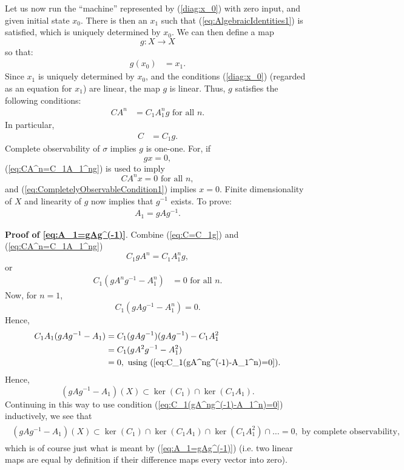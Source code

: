 \documentclass[12pt]{book}
\theoremstyle{plain}
\theoremstyle{definition}
\begin{document}
Let us now run the ``machine'' represented by (\ref{diag:x_0}) with zero input, and given initial state $x_0$.
There is then an $x_1$ such that (\ref{eq:AlgebraicIdentities1}) is satisfied, which is uniquely determined by $x_0$. We can then define a map
$$g: X \to X$$
so that:
\begin{align} \label{eq:g(x_0)=x_1}
    g(x_0) &= x_1.
\end{align}
Since $x_1$ is uniquely determined by $x_0$, and the conditions (\ref{diag:x_0}) (regarded as an equation for $x_1$) are linear, the map $g$ is linear. %
Thus, $g$ satisfies the following conditions:
\begin{align} \label{eq:CA^n=C_1A_1^ng}
    CA^n &= C_1A_1^ng \text{ for all } n.
\end{align}
In particular,
\begin{align} \label{eq:C=C_1g}
    C &= C_1g.
\end{align}
Complete observability of $\sigma$ implies $g$ is one-one.
For, if
$$gx = 0,$$
(\ref{eq:CA^n=C_1A_1^ng}) is used to imply
$$CA^nx = 0 \text{ for all } n,$$
and (\ref{eq:CompletelyObservableCondition1}) implies $x = 0$.
Finite dimensionality of $X$ and linearity of $g$ now implies that $g^{-1}$ exists.
To prove:
\begin{align} \label{eq:A_1=gAg^(-1)}
    A_1 = gAg^{-1}.
\end{align}

\textbf{Proof of \ref{eq:A_1=gAg^(-1)}}.
Combine (\ref{eq:C=C_1g}) and (\ref{eq:CA^n=C_1A_1^ng})
$$C_1gA^n = C_1A_1^ng,$$
or
\begin{align} \label{eq:C_1(gA^ng^(-1)-A_1^n)=0}
    C_1(gA^ng^{-1}-A_1^n) &= 0 \text{ for all } n.
\end{align}
Now, for $n = 1$,
$$C_1(gAg^{-1} - A_1^n) = 0.$$
Hence,
\begin{align*}
    C_1A_1(gAg^{-1}-A_1) &= C_1(gAg^{-1})(gAg^{-1}) - C_1A_1^2 \\
    &= C_1(gA^2g^{-1} - A_1^2) \\
    &= 0, \text{ using } (\ref{eq:C_1(gA^ng^(-1)-A_1^n)=0}).
\end{align*}
Hence,
$$(gAg^{-1}-A_1)(X) \subset \ker(C_1) \cap \ker(C_1A_1).$$
Continuing in this way to use condition (\ref{eq:C_1(gA^ng^(-1)-A_1^n)=0}) inductively, we see that
\begin{align*}
\begin{split}
    (gAg^{-1}-A_1)(X) \subset \ker(C_1) \cap \ker(C_1A_1) \cap \ker(C_1A_1^2) \cap \dots = 0, \text{ by complete observability},
\end{split}
\end{align*}
which is of course just what is meant by (\ref{eq:A_1=gAg^(-1)}) (i.e. two linear maps are equal by definition if their difference maps every vector into zero).
\end{document}

